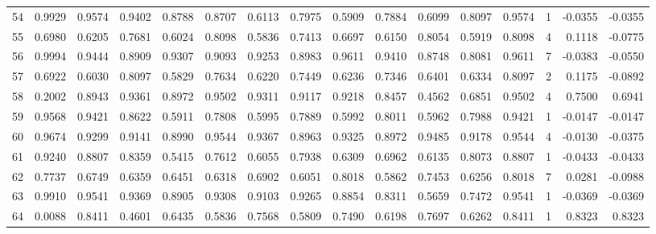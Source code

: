 \begin{tabular}{lrrrrrrrrrrrrrrr}
54  &      0.9929 &  0.9574 &  0.9402 &  0.8788 &  0.8707 &  0.6113 &  0.7975 &  0.5909 &  0.7884 &  0.6099 &   0.8097 &     0.9574 &      1 &                   -0.0355 &                    -0.0355 \\
55  &      0.6980 &  0.6205 &  0.7681 &  0.6024 &  0.8098 &  0.5836 &  0.7413 &  0.6697 &  0.6150 &  0.8054 &   0.5919 &     0.8098 &      4 &                    0.1118 &                    -0.0775 \\
56  &      0.9994 &  0.9444 &  0.8909 &  0.9307 &  0.9093 &  0.9253 &  0.8983 &  0.9611 &  0.9410 &  0.8748 &   0.8081 &     0.9611 &      7 &                   -0.0383 &                    -0.0550 \\
57  &      0.6922 &  0.6030 &  0.8097 &  0.5829 &  0.7634 &  0.6220 &  0.7449 &  0.6236 &  0.7346 &  0.6401 &   0.6334 &     0.8097 &      2 &                    0.1175 &                    -0.0892 \\
58  &      0.2002 &  0.8943 &  0.9361 &  0.8972 &  0.9502 &  0.9311 &  0.9117 &  0.9218 &  0.8457 &  0.4562 &   0.6851 &     0.9502 &      4 &                    0.7500 &                     0.6941 \\
59  &      0.9568 &  0.9421 &  0.8622 &  0.5911 &  0.7808 &  0.5995 &  0.7889 &  0.5992 &  0.8011 &  0.5962 &   0.7988 &     0.9421 &      1 &                   -0.0147 &                    -0.0147 \\
60  &      0.9674 &  0.9299 &  0.9141 &  0.8990 &  0.9544 &  0.9367 &  0.8963 &  0.9325 &  0.8972 &  0.9485 &   0.9178 &     0.9544 &      4 &                   -0.0130 &                    -0.0375 \\
61  &      0.9240 &  0.8807 &  0.8359 &  0.5415 &  0.7612 &  0.6055 &  0.7938 &  0.6309 &  0.6962 &  0.6135 &   0.8073 &     0.8807 &      1 &                   -0.0433 &                    -0.0433 \\
62  &      0.7737 &  0.6749 &  0.6359 &  0.6451 &  0.6318 &  0.6902 &  0.6051 &  0.8018 &  0.5862 &  0.7453 &   0.6256 &     0.8018 &      7 &                    0.0281 &                    -0.0988 \\
63  &      0.9910 &  0.9541 &  0.9369 &  0.8905 &  0.9308 &  0.9103 &  0.9265 &  0.8854 &  0.8311 &  0.5659 &   0.7472 &     0.9541 &      1 &                   -0.0369 &                    -0.0369 \\
64  &      0.0088 &  0.8411 &  0.4601 &  0.6435 &  0.5836 &  0.7568 &  0.5809 &  0.7490 &  0.6198 &  0.7697 &   0.6262 &     0.8411 &      1 &                    0.8323 &                     0.8323 \\

\end{tabular}

